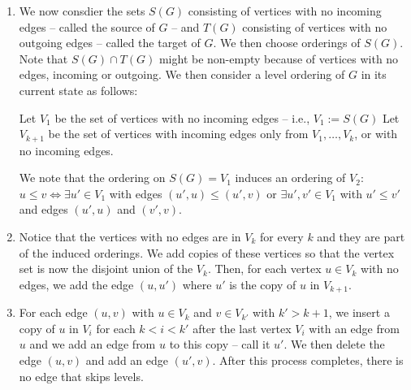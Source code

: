\documentclass[./Thick_TQFTs_and_Quantum_Information.tex]{subfiles}
\begin{document}
\begin{enumerate}
\item We now consdier the sets $S(G)$ consisting of vertices with no incoming
edges -- called the source of $G$ -- and $T(G)$ consisting of vertices with no
outgoing edges -- called the target of $G$. We then choose orderings of $S(G)$.
Note that $S(G) \cap T(G)$ might be non-empty because of vertices
with no edges, incoming or outgoing. We then consider a level ordering of $G$ in
its current state as follows:
\begin{enmrt}
\li Let $V_1$ be the set of vertices with no incoming edges -- i.e.,
$V_1 := S(G)$
\li Let $V_{k + 1}$ be the set of vertices with incoming edges only from
$V_1, \dots, V_k$, or with no incoming edges.
\end{enmrt}
We note that the ordering on $S(G) = V_1$ induces an ordering of $V_2$:
$u \leq v \iff \exists u' \in V_1$ with edges $(u', u) \leq (u', v)$ or
$\exists u', v' \in V_1$ with $u' \leq v'$ and edges $(u', u)$ and $(v', v)$.

\item Notice that the vertices with no edges are in $V_k$ for every $k$ and they
are part of the induced orderings. We add copies of these vertices so that the
vertex set is now the disjoint union of the $V_k$. Then, for each vertex
$u \in V_k$ with no edges, we add the edge $(u, u')$ where $u'$ is the copy of
$u$ in $V_{k + 1}$.

\item For each edge $(u, v)$ with $u \in V_k$ and $v \in V_{k'}$ with
$k' > k + 1$, we insert a copy of $u$ in $V_{i}$ for each $k < i < k'$ after the
last vertex $V_{i}$ with an edge from $u$ and we add an edge from $u$ to this
copy -- call it $u'$. We then delete the edge $(u, v)$ and add an edge
$(u', v)$. After this process completes, there is no edge that skips levels.


\end{enumerate}
\end{document}
